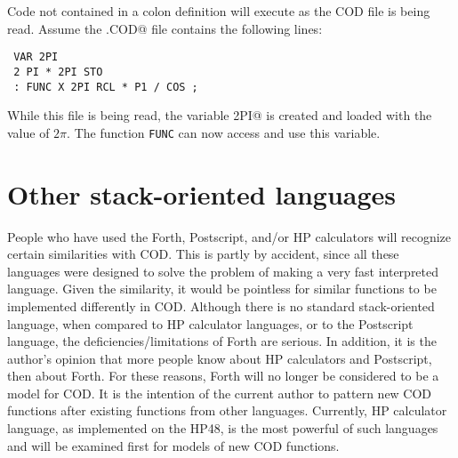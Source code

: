 Code not contained in a colon definition will execute
as the COD file is being read.
Assume the \verb@FUNC.COD@ file contains the following lines:
\begin{verbatim}
 VAR 2PI
 2 PI * 2PI STO
 : FUNC X 2PI RCL * P1 / COS ;
\end{verbatim}
While this file is being read,
the variable \verb@2PI@ is created and
loaded with the value of $2 \pi$.
The function {\tt FUNC} can now access and use this variable.

\section{Other stack-oriented languages}
People who have used the Forth, Postscript, and/or HP calculators
will recognize certain similarities with COD.
This is partly by accident,
since all these languages were designed
to solve the problem of making a very fast interpreted language.
Given the similarity,
it would be pointless for similar functions
to be implemented differently in COD.
Although there is no standard stack-oriented language,
when compared to HP calculator languages, or to the Postscript language,
the deficiencies/limitations of Forth are serious.
In addition, it is the author's opinion that more people know about
HP calculators and Postscript, then about Forth.
For these reasons,
Forth will no longer be considered to be a model for COD.
It is the intention of the current author to pattern new COD
functions after existing functions from other languages.
Currently, HP calculator language, as implemented on the HP48,
is the most powerful of such languages and will be examined first
for models of new COD functions.
